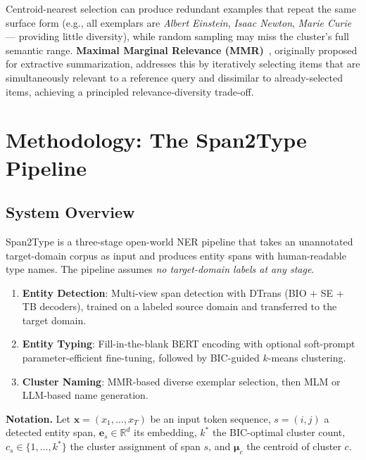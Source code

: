 \documentclass[11pt,a4paper]{article}
\begin{document}
Centroid-nearest selection can produce redundant examples that repeat the same surface form (e.g., all exemplars are \textit{Albert Einstein}, \textit{Isaac Newton}, \textit{Marie Curie} — providing little diversity), while random sampling may miss the cluster's full semantic range. \textbf{Maximal Marginal Relevance (MMR)}~\cite{carbonell1998}, originally proposed for extractive summarization, addresses this by iteratively selecting items that are simultaneously relevant to a reference query and dissimilar to already-selected items, achieving a principled relevance-diversity trade-off.

\section{Methodology: The Span2Type Pipeline}

\subsection{System Overview}

Span2Type is a three-stage open-world NER pipeline that takes an unannotated target-domain corpus as input and produces entity spans with human-readable type names. The pipeline assumes \emph{no target-domain labels at any stage}.

\begin{enumerate}[noitemsep]
  \item \textbf{Entity Detection}: Multi-view span detection with DTrans (BIO + SE + TB decoders), trained on a labeled source domain and transferred to the target domain.
  \item \textbf{Entity Typing}: Fill-in-the-blank BERT encoding with optional soft-prompt parameter-efficient fine-tuning, followed by BIC-guided $k$-means clustering.
  \item \textbf{Cluster Naming}: MMR-based diverse exemplar selection, then MLM or LLM-based name generation.
\end{enumerate}

\textbf{Notation.} Let $\mathbf{x} = (x_1,\ldots,x_T)$ be an input token sequence, $s = (i,j)$ a detected entity span, $\mathbf{e}_s \in \mathbb{R}^d$ its embedding, $k^*$ the BIC-optimal cluster count, $c_s \in \{1,\ldots,k^*\}$ the cluster assignment of span $s$, and $\boldsymbol{\mu}_c$ the centroid of cluster $c$.
\end{document}
